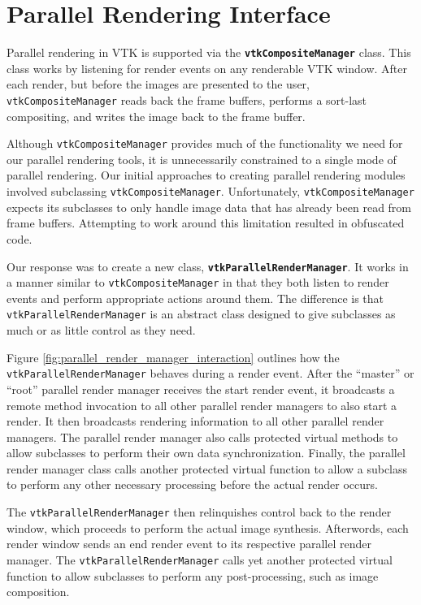 \documentclass[letterpaper]{acmsiggraph}
\newcommand{\cidentifier}[1]{\texttt{#1}}
\newcommand{\keyterm}[1]{\textbf{#1}}
\begin{document}
  \section{Parallel Rendering Interface}
  \label{sec:parallel_rendering_interface}

  Parallel rendering in VTK is supported via the
  \keyterm{\cidentifier{vtk\-Composite\-Manager}} class.  This class works
  by listening for render events on any renderable VTK window.  After each
  render, but before the images are presented to the user,
  \cidentifier{vtk\-Composite\-Manager} reads back the frame buffers,
  performs a sort-last compositing, and writes the image back to the frame
  buffer.

  Although \cidentifier{vtk\-Composite\-Manager} provides much of the
  functionality we need for our parallel rendering tools, it is
  unnecessarily constrained to a single mode of parallel rendering.  Our
  initial approaches to creating parallel rendering modules involved
  subclassing \cidentifier{vtk\-Composite\-Manager}.  Unfortunately,
  \cidentifier{vtk\-Composite\-Manager} expects its subclasses to only
  handle image data that has already been read from frame buffers.
  Attempting to work around this limitation resulted in obfuscated code.

  Our response was to create a new class,
  \keyterm{\cidentifier{vtk\-Parallel\-Render\-Manager}}.  It works in a
  manner similar to \cidentifier{vtk\-Composite\-Manager} in that they both
  listen to render events and perform appropriate actions around them.  The
  difference is that \cidentifier{vtk\-Parallel\-Render\-Manager} is an
  abstract class designed to give subclasses as much or as little control
  as they need.

  Figure \ref{fig:parallel_render_manager_interaction} outlines how the
  \cidentifier{vtk\-Parallel\-Render\-Manager} behaves during a render
  event.  After the ``master'' or ``root'' parallel render manager receives
  the start render event, it broadcasts a remote method invocation to all
  other parallel render managers to also start a render.  It then
  broadcasts rendering information to all other parallel render managers.
  The parallel render manager also calls protected virtual methods to allow
  subclasses to perform their own data synchronization.  Finally, the
  parallel render manager class calls another protected virtual function to
  allow a subclass to perform any other necessary processing before the
  actual render occurs.

  The \cidentifier{vtk\-Parallel\-Render\-Manager} then relinquishes
  control back to the render window, which proceeds to perform the actual
  image synthesis.  Afterwords, each render window sends an end render
  event to its respective parallel render manager.  The
  \cidentifier{vtk\-Parallel\-Render\-Manager} calls yet another protected
  virtual function to allow subclasses to perform any post-processing, such
  as image composition.
\end{document}
